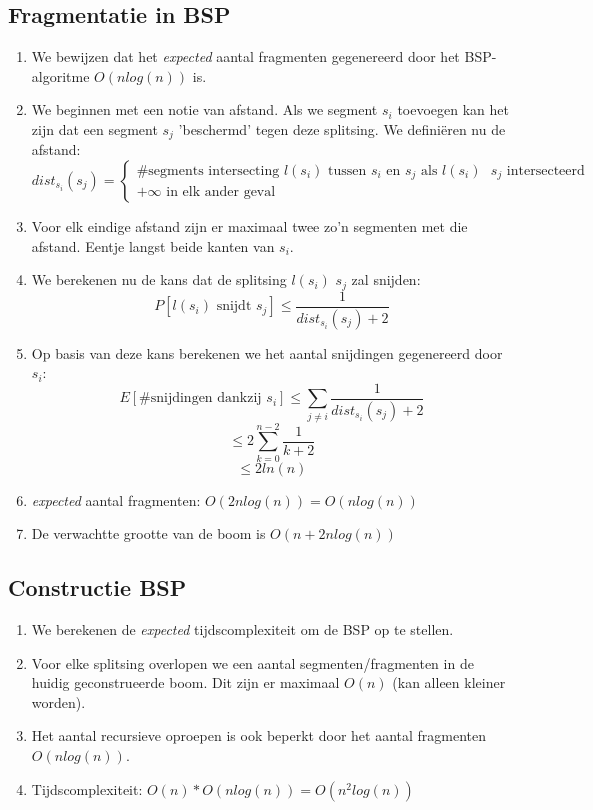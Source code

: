 \documentclass[12pt,a4paper]{article}
\begin{document}
		\subsection{Fragmentatie in BSP}
			\begin{enumerate}
				\item We bewijzen dat het \emph{expected} aantal fragmenten gegenereerd door het BSP-algoritme $O(n log (n))$ is. 
				\item We beginnen met een notie van afstand. Als we segment $s_i$ toevoegen kan het zijn dat een segment $s_j$ 'beschermd' tegen deze splitsing. We definiëren nu de afstand:
				$$dist_{s_i}(s_j) = \begin{cases}
					\text{\#segments intersecting $l(s_i)$ tussen $s_i$ en $s_j$ als $l(s_i)$ $s_j$ intersecteerd}\\
					+\infty \text{ in elk ander geval}
				\end{cases}$$
				\item Voor elk eindige afstand zijn er maximaal twee zo'n segmenten met die afstand. Eentje langst beide kanten van $s_i$.
				\item We berekenen nu de kans dat de splitsing $l(s_i)$ $s_j$ zal snijden:
				$$P[l(s_i) \text{ snijdt $s_j$}] \leq \frac{1}{dist_{s_i}(s_j) + 2}$$
				\item Op basis van deze kans berekenen we het aantal snijdingen gegenereerd door $s_i$:
				$$E[\text{\# snijdingen dankzij $s_i$}] \leq \sum_{j \neq i}\frac{1}{dist_{s_i}(s_j) + 2}$$
				$$\leq 2\sum_{k = 0}^{n-2}\frac{1}{k + 2}$$
				$$\leq 2 ln (n)$$
				\item \emph{expected} aantal fragmenten: $O(2n log (n)) = O(n log (n))$
				\item De verwachtte grootte van de boom is $O(n + 2n log (n))$ 
			\end{enumerate}
	
		\subsection{Constructie BSP}
			\begin{enumerate}
				\item We berekenen de \emph{expected} tijdscomplexiteit om de BSP op te stellen. 
				\item Voor elke splitsing overlopen we een aantal segmenten/fragmenten in de huidig geconstrueerde boom. Dit zijn er maximaal $O(n)$ (kan alleen kleiner worden).
				\item Het aantal recursieve oproepen is ook beperkt door het aantal fragmenten $O(n log (n))$. 
				\item Tijdscomplexiteit: $O(n) * O(n log (n)) = O(n^2 log (n))$
			\end{enumerate}
		
\end{document}
